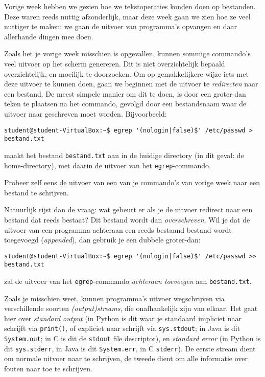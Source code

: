 \documentclass[a4paper,twoside,openany]{memoir}
\begin{document}
Vorige week hebben we gezien hoe we tekstoperaties konden doen op bestanden.
Deze waren reeds nuttig afzonderlijk, maar deze week gaan we zien hoe ze veel
nuttiger te maken: we gaan de uitvoer van programma's opvangen en daar
allerhande dingen mee doen.

Zoals het je vorige week misschien is opgevallen, kunnen sommige commando's veel
uitvoer op het scherm genereren. Dit is niet overzichtelijk bepaald
overzichtelijk, en moeilijk te doorzoeken. Om op gemakkelijkere wijze iets met
deze uitvoer te kunnen doen, gaan we beginnen met de uitvoer te
\emph{redirecten} naar een bestand. De meest simpele manier om dit te doen, is
door een groter-dan teken te plaatsen na het commando, gevolgd door een
bestandsnaam waar de uitvoer naar geschreven moet worden. Bijvoorbeeld:

\begin{verbatim}
student@student-VirtualBox:~$ egrep '(nologin|false)$' /etc/passwd > bestand.txt
\end{verbatim}

maakt het bestand \verb!bestand.txt! aan in de huidige directory (in dit geval:
de home-directory), met daarin de uitvoer van het \verb!egrep!-commando.

Probeer zelf eens de uitvoer van een van je commando's van vorige week naar een
bestand te schrijven.

Natuurlijk rijst dan de vraag: wat gebeurt er als je de uitvoer redirect naar
een bestand dat reeds bestaat? Dit bestand wordt dan \emph{overschreven}. Wil je
dat de uitvoer van een programma achteraan een reeds bestaand bestand wordt
toegevoegd (\emph{appended}), dan gebruik je een dubbele groter-dan:

\begin{verbatim}
student@student-VirtualBox:~$ egrep '(nologin|false)$' /etc/passwd >> bestand.txt
\end{verbatim}

zal de uitvoer van het \verb!egrep!-commando \emph{achteraan toevoegen} aan
\verb!bestand.txt!.

Zoals je misschien weet, kunnen programma's uitvoer wegschrijven via
verschillende soorten \emph{(output)streams}, die onafhankelijk zijn van elkaar.
Het gaat hier over \emph{standard output} (in Python is dit waar je standaard
impliciet naar schrijft via \verb!print()!, of expliciet naar schrijft via
\verb!sys.stdout!; in Java is dit \verb!System.out!; in C is dit de \verb!stdout!
file descriptor), en \emph{standard error} (in Python is dit \verb!sys.stderr!,
in Java is dit \verb!System.err!, in C \verb!stderr!). De
eerste stream dient om normale uitvoer naar te schrijven, de tweede dient om
alle informatie over fouten naar toe te schrijven.
\end{document}
